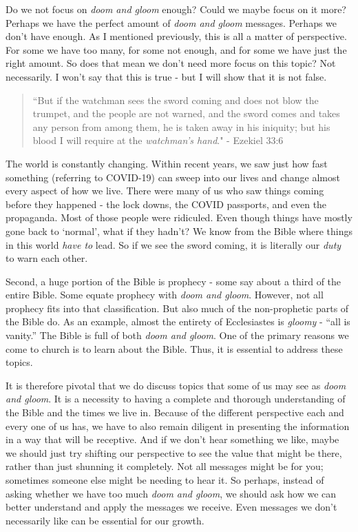 \documentclass[10pt]{article}
\begin{document}
\begin{multicols}{2}
Do we not focus on \textit{doom and gloom} enough? Could we maybe focus on it more? Perhaps we have the perfect amount of \textit{doom and gloom} messages. Perhaps we don't have enough. As I mentioned previously, this is all a matter of perspective. For some we have too many, for some not enough, and for some we have just the right amount. So does that mean we don’t need more focus on this topic? Not necessarily. I won't say that this is true - but I will show that it is not false.

\begin{quotation}
	``But if the watchman sees the sword coming and does not blow the trumpet, and the people are not warned, and the sword comes and takes any person from among them, he is taken away in his iniquity; but his blood I will require at the \textit{watchman’s hand}." - Ezekiel 33:6
\end{quotation}

The world is constantly changing. Within recent years, we saw just how fast something (referring to COVID-19) can sweep into our lives and change almost every aspect of how we live. There were many of us who saw things coming before they happened - the lock downs, the COVID passports, and even the propaganda. Most of those people were ridiculed. Even though things have mostly gone back to `normal', what if they hadn't? We know from the Bible where things in this world \textit{have to} lead. So if we see the sword coming, it is literally our \textit{duty} to warn each other.

Second, a huge portion of the Bible is prophecy - some say about a third of the entire Bible. Some equate prophecy with \textit{doom and gloom}. However, not all prophecy fits into that classification. But also much of the non-prophetic parts of the Bible do. As an example, almost the entirety of Ecclesiastes is \textit{gloomy} - ``all is vanity.'' The Bible is full of both \textit{doom and gloom}. One of the primary reasons we come to church is to learn about the Bible. Thus, it is essential to address these topics.

It is therefore pivotal that we do discuss topics that some of us may see as \textit{doom and gloom}. It is a necessity to having a complete and thorough understanding of the Bible and the times we live in. Because of the different perspective each and every one of us has, we have to also remain diligent in presenting the information in a way that will be receptive. And if we don't hear something we like, maybe we should just try shifting our perspective to see the value that might be there, rather than just shunning it completely. Not all messages might be for you; sometimes someone else might be needing to hear it. So perhaps, instead of asking whether we have too much \textit{doom and gloom}, we should ask how we can better understand and apply the messages we receive. Even messages we don't necessarily like can be essential for our growth.


\end{multicols}
\end{document}
